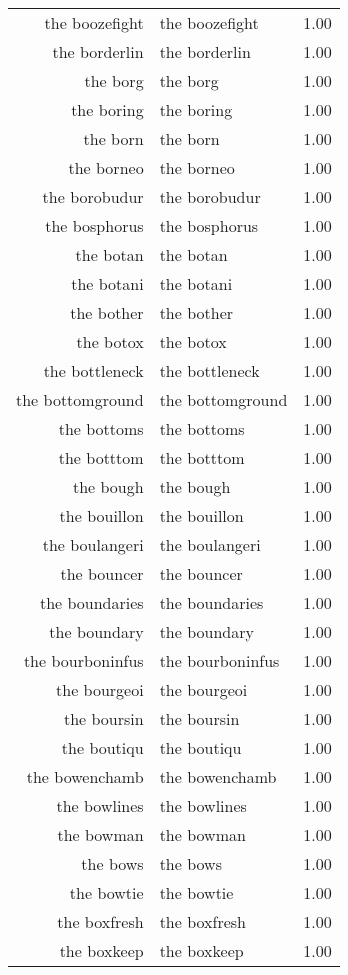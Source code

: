 \begin{table}[ht]
\begin{tabular}{rlr}
  the boozefight & the boozefight & 1.00 \\ 
  the borderlin & the borderlin & 1.00 \\ 
  the borg & the borg & 1.00 \\ 
  the boring & the boring & 1.00 \\ 
  the born & the born & 1.00 \\ 
  the borneo & the borneo & 1.00 \\ 
  the borobudur & the borobudur & 1.00 \\ 
  the bosphorus & the bosphorus & 1.00 \\ 
  the botan & the botan & 1.00 \\ 
  the botani & the botani & 1.00 \\ 
  the bother & the bother & 1.00 \\ 
  the botox & the botox & 1.00 \\ 
  the bottleneck & the bottleneck & 1.00 \\ 
  the bottomground & the bottomground & 1.00 \\ 
  the bottoms & the bottoms & 1.00 \\ 
  the botttom & the botttom & 1.00 \\ 
  the bough & the bough & 1.00 \\ 
  the bouillon & the bouillon & 1.00 \\ 
  the boulangeri & the boulangeri & 1.00 \\ 
  the bouncer & the bouncer & 1.00 \\ 
  the boundaries & the boundaries & 1.00 \\ 
  the boundary & the boundary & 1.00 \\ 
  the bourboninfus & the bourboninfus & 1.00 \\ 
  the bourgeoi & the bourgeoi & 1.00 \\ 
  the boursin & the boursin & 1.00 \\ 
  the boutiqu & the boutiqu & 1.00 \\ 
  the bowenchamb & the bowenchamb & 1.00 \\ 
  the bowlines & the bowlines & 1.00 \\ 
  the bowman & the bowman & 1.00 \\ 
  the bows & the bows & 1.00 \\ 
  the bowtie & the bowtie & 1.00 \\ 
  the boxfresh & the boxfresh & 1.00 \\ 
  the boxkeep & the boxkeep & 1.00 \\ 

\end{tabular}
\end{table}
